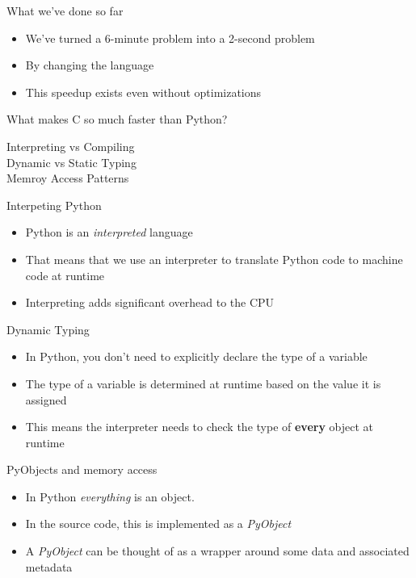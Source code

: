 \documentclass[12pt, aspectration=169]{beamer}
\begin{document}
    \begin{frame}{What we've done so far}
        \begin{itemize}
            \item We've turned a 6-minute problem into a 2-second problem
            \item By changing the language
            \item This speedup exists even without optimizations
        \end{itemize}
    \end{frame}

    \begin{frame}{What makes C so much faster than Python?}
        \begin{description}
            \item[Interpreting vs Compiling]
            \item[Dynamic vs Static Typing]
            \item[Memroy Access Patterns]
        \end{description}
    \end{frame}

    \begin{frame}{Interpeting Python}
        \begin{itemize}
            \item Python is an \textit{interpreted} language
            \item That means that we use an interpreter to translate Python code to machine code at runtime
            \item Interpreting adds significant overhead to the CPU
        \end{itemize}
    \end{frame}

    \begin{frame}{Dynamic Typing}
        \begin{itemize}
            \item In Python, you don't need to explicitly declare the type of a variable
            \item The type of a variable is determined at runtime based on the value it is assigned
            \item This means the interpreter needs to check the type of \textbf{every} object at runtime
        \end{itemize}
    \end{frame}

    \begin{frame}{PyObjects and memory access}
        \begin{itemize}
            \item In Python \textit{everything} is an object.
            \item In the source code, this is implemented as a \textit{PyObject}
            \item A \textit{PyObject} can be thought of as a wrapper around some data and associated metadata
        \end{itemize}
    \end{frame}
\end{document}
